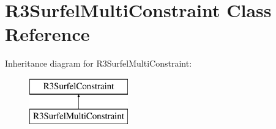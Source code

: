 \hypertarget{class_r3_surfel_multi_constraint}{}\section{R3\+Surfel\+Multi\+Constraint Class Reference}
\label{class_r3_surfel_multi_constraint}
Inheritance diagram for R3\+Surfel\+Multi\+Constraint\+:\begin{figure}[H]
\begin{center}
\leavevmode
\includegraphics[height=2.000000cm]{class_r3_surfel_multi_constraint}
\end{center}
\end{figure}
